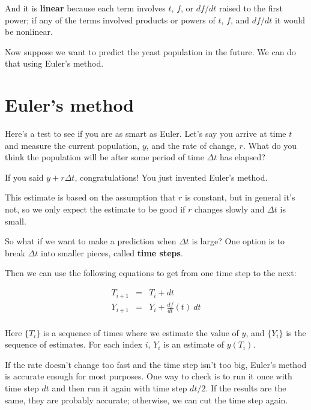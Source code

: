 \documentclass[main.tex]{subfiles}
\begin{document}

And it is {\bf linear} because each term involves $t$, $f$, or
$df/dt$ raised to the first power; if any of the terms involved
products or powers of $t$, $f$, and $df/dt$ it would be
nonlinear.

Now suppose we want to predict the yeast population in the future.  We can do that using Euler's method.


\section{Euler's method}

Here's a test to see if you are as smart as Euler.  Let's say  you arrive at time $t$ and measure the current population, $y$, and
the rate of change, $r$.  What do you think the population will
be after some period of time $\Delta t$ has elapsed?

If you said $y + r \Delta t$, congratulations!  You just invented
Euler's method.


This estimate is based on the assumption that $r$ is constant, but
in general it's not, so we only expect the estimate to be good if
$r$ changes slowly and $\Delta t$ is small.

So what if we want to make a prediction when $\Delta t$ is large?
One option is to break $\Delta t$ into smaller pieces, called
{\bf time steps}.

Then we can use the following equations to get from one time step to the next:

\begin{eqnarray}
T_{i+1} &=& T_i + dt                       \\
Y_{i+1} &=& Y_i + \frac{df}{dt}(t)~dt           \\
\end{eqnarray}

Here $\{T_i\}$ is a sequence of times where we estimate the value
of $y$, and $\{Y_i\}$ is the sequence of estimates.  For each
index $i$, $Y_i$ is an estimate of $y(T_i)$.


If the rate doesn't change too fast and the time step isn't
too big, Euler's method is accurate enough for most purposes.  One
way to check is to run it once with time step $dt$ and then run it
again with time step $dt/2$.  If the results are the same, they are
probably accurate; otherwise, we can cut the time step again.
\end{document}
